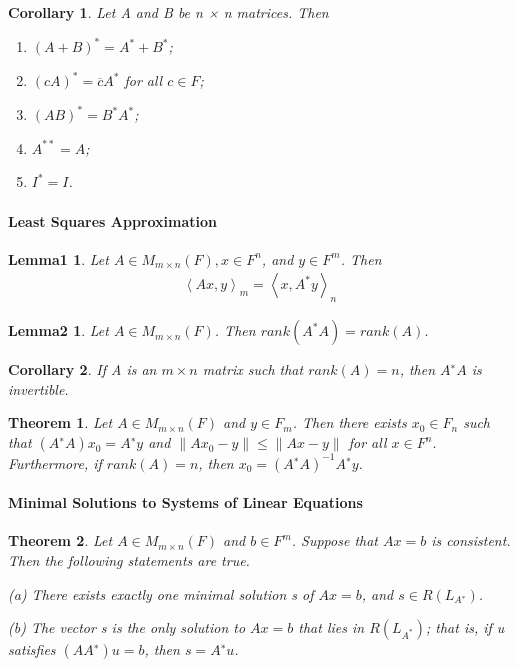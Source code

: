 \documentclass{article}
\newcommand{\norm}[1]{\left\lVert#1\right\rVert}
\newcommand{\ip}[1]{\left\langle {#1}\right\rangle} %
\newcommand{\enumalph}[0]{\begin{enumerate}[label=(\alph*)]}
\theoremstyle{plain}
\newtheorem{theorem}{Theorem}[section]
\newtheorem*{lemma1}{Lemma1}
\newtheorem*{lemma2}{Lemma2}
\newtheorem*{corollary}{Corollary}
\theoremstyle{plain} %
\begin{document}
\begin{corollary}
  Let A and B be n × n matrices. Then
  \enumalph
    \item $(A+B)^*=A^*+B^*$;
    \item $(cA)^*=\overline{c}A^*$ for all $c\in F$;
    \item $(AB)^*=B^*A^*$;
    \item $A^{**} = A$;
    \item $I^*=I$.
  \end{enumerate}
\end{corollary}

\paragraph{Least Squares Approximation}

\begin{lemma1}
  Let $A \in M_{m×n}(F), x \in F^n$, and $y \in F^m$. Then
  \begin{align*}
    \ip{Ax, y}_m=\ip{x, A^*y}_n
  \end{align*}
\end{lemma1}

\begin{lemma2}
  Let $A\in M_{m\times n}(F)$. Then $rank(A^*A)=rank(A)$.
\end{lemma2}

\begin{corollary}
  If A is an $m \times n$ matrix such that $rank(A) = n$, then $A^∗A$ is invertible.
\end{corollary}

\begin{theorem}
  Let $A \in M_{m×n}(F)$ and $y \in F_m$. Then there exists
$x_0 \in F_n$ such that $(A^∗A)x_0 = A^∗y$ and $\norm{Ax_0 − y}\leq \norm{Ax − y}$ for all $x \in F^n$. Furthermore, if $rank(A) = n$, then $x_0 = (A^∗A)^{-1}A^∗y$.
\end{theorem}

\paragraph{Minimal Solutions to Systems of Linear Equations}

\begin{theorem}
  Let $A \in M_{m×n}(F)$ and $b \in F^m$. Suppose that $Ax = b$ is consistent. Then the following statements are true.

  (a) There exists exactly one minimal solution s of $Ax = b$, and $s \in R(L_{A^∗})$.

  (b) The vector s is the only solution to $Ax = b$ that lies in $R(L_{A^*})$; that is, if u satisfies $(AA^∗)u = b$, then $s = A^∗u$.
\end{theorem}
\end{document}

